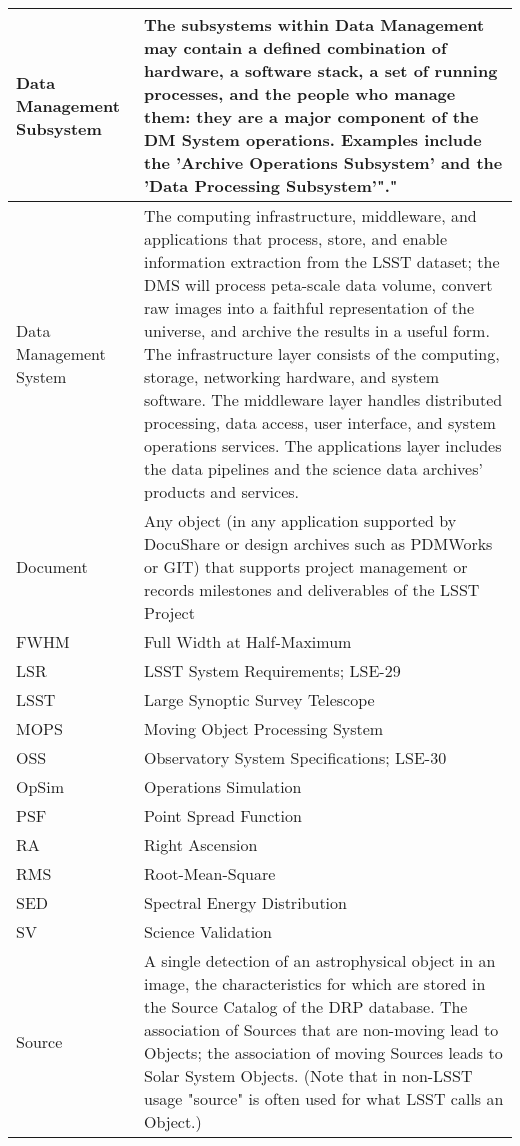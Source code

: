 \begin{longtable}{|l|p{}|}
Data Management Subsystem & The subsystems within Data Management may contain a defined combination of hardware, a software stack, a set of running processes, and the people who manage them: they are a major component of the DM System operations. Examples include the 'Archive Operations Subsystem' and the 'Data Processing Subsystem'"." \\\hline
Data Management System & The computing infrastructure, middleware, and applications that process, store, and enable information extraction from the LSST dataset; the DMS will process peta-scale data volume, convert raw images into a faithful representation of the universe, and archive the results in a useful form. The infrastructure layer consists of the computing, storage, networking hardware, and system software. The middleware layer handles distributed processing, data access, user interface, and system operations services. The applications layer includes the data pipelines and the science data archives' products and services. \\\hline
Document & Any object (in any application supported by DocuShare or design archives such as PDMWorks or GIT) that supports project management or records milestones and deliverables of the LSST Project \\\hline
FWHM & Full Width at Half-Maximum \\\hline
LSR & LSST System Requirements; LSE-29 \\\hline
LSST & Large Synoptic Survey Telescope \\\hline
MOPS & Moving Object Processing System \\\hline
OSS & Observatory System Specifications; LSE-30 \\\hline
OpSim & Operations Simulation \\\hline
PSF & Point Spread Function \\\hline
RA & Right Ascension \\\hline
RMS & Root-Mean-Square \\\hline
SED & Spectral Energy Distribution \\\hline
SV & Science Validation \\\hline
Source & A single detection of an astrophysical object in an image, the characteristics for which are stored in the Source Catalog of the DRP database. The association of Sources that are non-moving lead to Objects; the association of moving Sources leads to Solar System Objects. (Note that in non-LSST usage "source" is often used for what LSST calls an Object.) \\\hline

\end{longtable}
